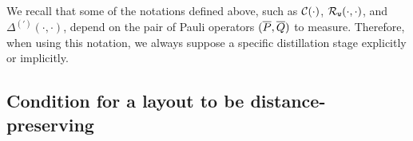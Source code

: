 \documentclass[
 prx,
 reprint,
 superscriptaddress,
 longbibliography,
 dvipsnames
]{revtex4-2}
\begin{document}

We recall that some of the notations defined above, such as $\mathcal{C}\qty(\cdot)$, $\mathcal{R}_{\texttt{w}}\qty(\cdot, \cdot)$, and $\Delta^{(\prime)}(\cdot, \cdot)$, depend on the pair of Pauli operators $(\overline{P}, \overline{Q})$ to measure.
Therefore, when using this notation, we always suppose a specific distillation stage explicitly or implicitly.

\subsection{Condition for a layout to be distance-preserving}
\end{document}
